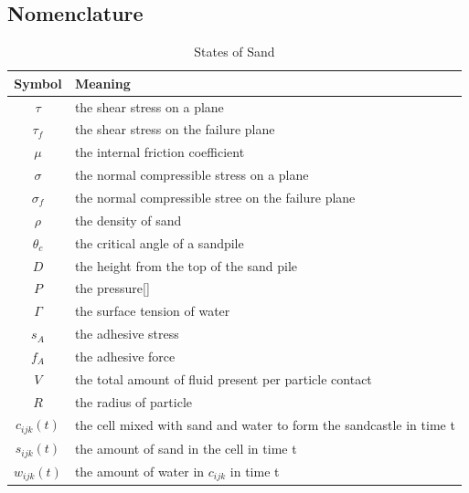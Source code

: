 \documentclass[12pt]{article}
\begin{document}
\subsection{Nomenclature}
\begin{table}[H]
    \caption{States of Sand}
    \vspace{5pt}
    \centering
    \begin{tabular}{cl}
    	\hline
        Symbol     & Meaning                                                \\
        \hline
        $\tau$     & the shear stress on a plane                            \\
        $\tau_f$   & the shear stress on the failure plane                  \\
        $\mu$      & the internal friction coefficient                      \\
        $\sigma$   & the normal compressible stress on a plane              \\
        $\sigma_f$ & the normal compressible stree on the failure plane     \\
        $\rho$     & the density of sand                                    \\
        $\theta_c$ & the critical angle of a sandpile                       \\
        $D$        & the height from the top of the sand pile               \\
        $P$        & the pressure[]                                         \\
        $\Gamma$   & the surface tension of water                           \\
        $s_A$      & the adhesive stress                                    \\
        $f_A$      & the adhesive force                                     \\
        $V$        & the total amount of fluid present per particle contact \\
        $R$        & the radius of particle                                 \\
        $c_{ijk}(t)$ & the cell mixed with sand and water to form the sandcastle in time t \\
        $s_{ijk}(t)$ & the amount of sand in the cell in time t                            \\
        $w_{ijk}(t)$ & the amount of water in  $c_{ijk}$ in time t                         \\

\end{tabular}
\end{table}
\end{document}
